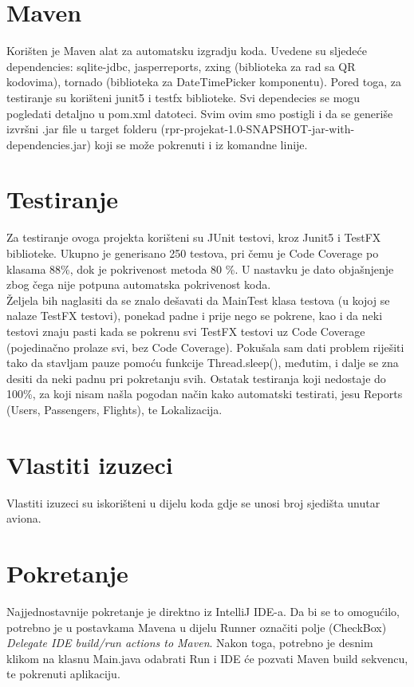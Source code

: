 \section{Maven}

Korišten je Maven alat za automatsku izgradju koda. Uvedene su sljedeće dependencies: sqlite-jdbc, jasperreports, zxing (biblioteka za rad sa QR kodovima), tornado (biblioteka za DateTimePicker komponentu). Pored toga, za testiranje su korišteni junit5 i testfx biblioteke. Svi dependecies se mogu pogledati detaljno u pom.xml datoteci. Svim ovim smo postigli i da se generiše izvršni .jar file u target folderu (rpr-projekat-1.0-SNAPSHOT-jar-with-dependencies.jar) koji se može pokrenuti i iz komandne linije.

\section{Testiranje}

Za testiranje ovoga projekta korišteni su JUnit testovi, kroz Junit5 i TestFX biblioteke. Ukupno je generisano 250 testova, pri čemu je Code Coverage po klasama 88\%, dok je pokrivenost metoda 80 \%. U nastavku je dato objašnjenje zbog čega nije potpuna automatska pokrivenost koda.\\

Željela bih naglasiti da se znalo dešavati da MainTest klasa testova (u kojoj se nalaze TestFX testovi), ponekad padne i prije nego se pokrene, kao i da neki testovi znaju pasti kada se pokrenu svi TestFX testovi uz Code Coverage (pojedinačno prolaze svi, bez Code Coverage). Pokušala sam dati problem riješiti tako da stavljam pauze pomoću funkcije Thread.sleep(), međutim, i dalje se zna desiti da neki padnu pri pokretanju svih. Ostatak testiranja koji nedostaje do 100\%, za koji nisam našla pogodan način kako automatski testirati, jesu Reports (Users, Passengers, Flights), te Lokalizacija. 

\section{Vlastiti izuzeci}

Vlastiti izuzeci su iskorišteni u dijelu koda gdje se unosi broj sjedišta unutar aviona.

\section{Pokretanje}

Najjednostavnije pokretanje je direktno iz IntelliJ IDE-a. Da bi se to omogućilo, potrebno je u postavkama Mavena u dijelu Runner označiti polje (CheckBox) \textit{Delegate IDE build/run actions to Maven}. Nakon toga, potrebno je desnim klikom na klasnu Main.java odabrati Run i IDE će pozvati Maven build sekvencu, te pokrenuti aplikaciju.


